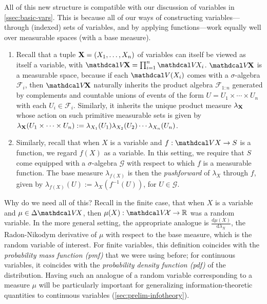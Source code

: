 All of this new structure is compatible with our discussion of variables in \cref{ssec:basic-vars}.
This is because all of our ways of constructing variables---through (indexed) sets of variables, and by applying functions---work equally well over measurable spaces (with a base measure).
\begin{enumerate}
\item
Recall that a tuple $\mathbf X = (X_1, \ldots, X_n)$ of variables can itself be viewed as itself a variable, with
    $\V\!\mat X = \prod_{i=1}^n \V \! X_i$.
$\V\!\mat X$ is a measurable space, because if each $\V(X_i)$ comes with a $\sigma$-algebra $\mathcal F_i$,
then $\V\!\mat X$ naturally inherits the product algebra $\mathcal F_{1:n}$ generated by complements and countable unions of events of the form $U = U_1 \times \cdots \times U_n$ with each $U_i \in \mathcal F_i$. 
Similarly, it inherits the unique product measure $\lambda_{\mathbf X}$
whose action on such primitive measurable sets is given by
$\lambda_{\mathbf X}(U_1 \times \cdots\times U_n) := \lambda_{X_1}(U_1)
        \lambda_{X_2}(U_2) \cdots \lambda_{X_n}(U_n)$.

\item Similarly, recall that when $X$ is a variable and $f : \V X \to S$ is a function, we regard $f(X)$ as a variable. In this setting, we require that $S$ 
    come equipped with a $\sigma$-algebra $\mathcal G$ with respect to which $f$ is a measurable function.  
    The base measure $\lambda_{f(X)}$ is then the \emph{pushforward} of $\lambda_X$ through $f$, given by 
    $\lambda_{f(X)}(U) := \lambda_X( f^{-1}(U))$, for $U \in \mathcal G$.
\end{enumerate}

 
%
Why do we need all of this? 
Recall in the finite case, that when $X$ is a variable and $\mu \in \Delta \V\!X$, then $\mu(X) : \V\!\X \to \mathbb R$ was a random variable. 
In the more general setting, the appropriate analogue is 
    $\frac{\mathrm d\mu(X)}{\mathrm d \lambda_X}$,
the Radon-Nikodym derivative
of $\mu$ with respect to the base measure, which is the random variable of interest.
%
For finite variables, this definition coincides with the \emph{probability mass function (pmf)} that we were using before;
for continuous variables, 
    it coincides with the \emph{probability density function (pdf)} of the distribution.
Having such an analogue of a random variable corresponding to a measure $\mu$ will be particularly important for generalizing information-theoretic quantities to continuous variables (\cref{sec:prelim-infotheory}).
 
